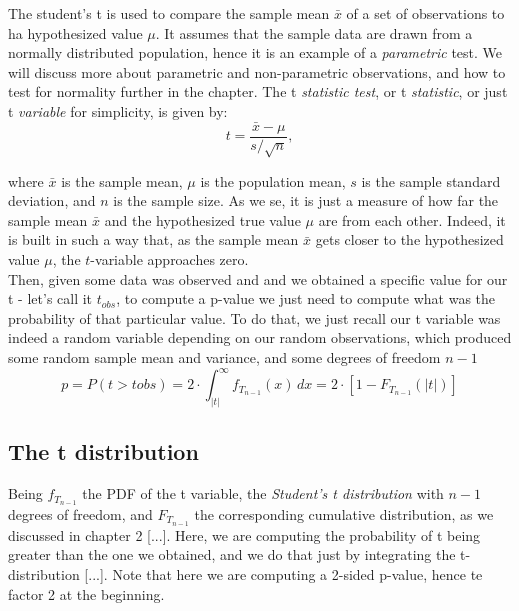 \documentclass{book}
\begin{document}
The student's t is used to compare the sample mean $\bar{x}$ of a set of observations to ha hypothesized value $\mu$. It assumes that the sample data are drawn from a normally distributed population, hence it is an example of a \textit{parametric} test. We will discuss more about parametric and non-parametric observations, and how to test for normality further in the chapter. The t \textit{statistic test}, or t \textit{statistic}, or just t \textit{variable} for simplicity, is given by:
\begin{equation}
    t = \frac{\bar{x} - \mu}{s / \sqrt{n}},
\end{equation}

where $\bar{x}$ is the sample mean, $\mu$ is the population mean, $s$ is the sample standard deviation, and $n$ is the sample size. As we se, it is just a measure of how far the sample mean $\bar{x}$ and the hypothesized true value $\mu$ are from each other. Indeed, it is built in such a way that, as the sample mean $\bar{x}$ gets closer to the hypothesized value $\mu$, the $t$-variable approaches zero.\\

Then, given some data was observed and and we obtained a specific value for our t - let's call it \textit{$t_{obs}$}, to compute a p-value we just need to compute what was the probability of that particular value. To do that, we just recall our t variable was indeed a random variable depending on our random observations, which produced some random sample mean and variance, and some degrees of freedom $n - 1$
\begin{equation}
	p = P\left(t > t obs \right) = 2 \cdot \int_{|t|}^{\infty} f_{T_{n-1}}(x)\,dx = 2 \cdot \left[1 - F_{T_{n-1}}(|t|)\right]
\end{equation}

\subsection*{The t distribution}

Being $f_{T_{n-1}}$ the PDF of the t variable, the \textit{Student's t distribution} with $n - 1$ degrees of freedom, and $F_{T_{n-1}}$ the corresponding cumulative distribution, as we discussed in chapter 2 [...]. Here, we are computing the probability of t being greater than the one we obtained, and we do that just by integrating the t-distribution [...]. Note that here we are computing a 2-sided p-value, hence te factor 2 at the beginning.\\
\end{document}
